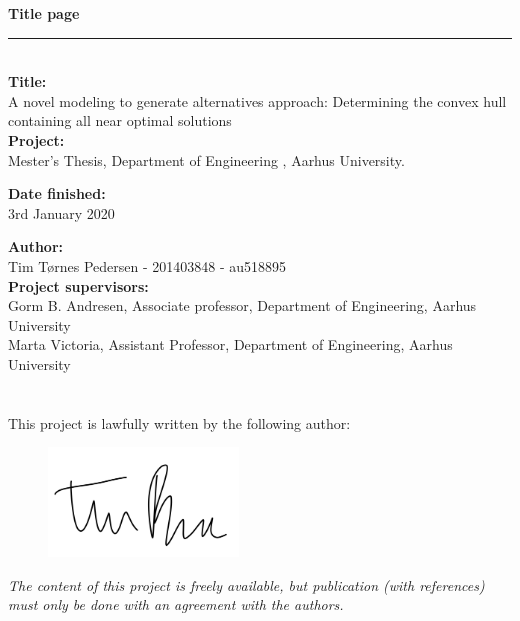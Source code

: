 
\vspace{3.5cm}
{\Huge\textbf{Title page}} \\
\rule{1.0\textwidth}{0.1mm}\\ %

\textbf{Title:}\\
A novel modeling to generate alternatives approach: Determining the convex hull containing all near optimal solutions \\

\textbf{Project:}\\
Mester's Thesis, Department of Engineering , Aarhus University.

\textbf{Date finished:}\\ 3rd January 2020

\textbf{Author:}\\ 
Tim Tørnes Pedersen - 201403848 - au518895\\

\textbf{Project supervisors:}\\
Gorm B. Andresen, Associate professor,  Department of Engineering, Aarhus University\\ 
Marta Victoria, Assistant Professor, Department of Engineering, Aarhus University\\\\ \\


This project is lawfully written by the following author:

\begin{figure}[H]
\includegraphics[width=0.45\textwidth]{./Images/underskrift}
\end{figure}



\textit{The content of this project is freely available, but publication (with references) must only be done with an agreement with the authors.}

\newpage
